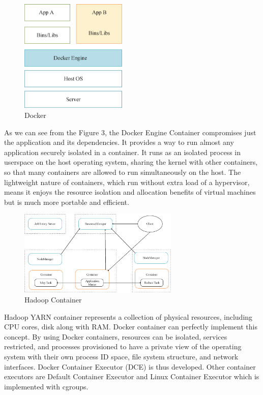\begin{figure}[t]
  \centering
  \includegraphics[width=2in]{figs/docker.eps}
  \caption{Docker}
  \label{fig:overview}
\end{figure}

As we can see from the Figure 3, the Docker Engine Container compromises just the application and its dependencies. It provides a way to run almost any application securely isolated in a container. It runs as an isolated process in userspace on the host operating system, sharing the kernel with other containers, so that many containers are allowed to run simultaneously on the host. The lightweight nature of containers, which run without extra load of a hypervisor, means it enjoys the resource isolation and allocation benefits of virtual machines but is much more portable and efficient.

\begin{figure}[t]
  \centering
  \includegraphics[width=3in]{figs/Container.eps}
  \caption{Hadoop Container}
  \label{fig:overview}
\end{figure}

Hadoop YARN container represents a collection of physical resources, including CPU cores, disk along with RAM. Docker container can perfectly implement this concept. By using Docker containers, resources can be isolated, services restricted, and processes provisioned to have a private view of the operating system with their own process ID space, file system structure, and network interfaces. Docker Container Executor (DCE) is thus developed. Other container executors are Default Container Executor and Linux Container Executor which is implemented with cgroups.

